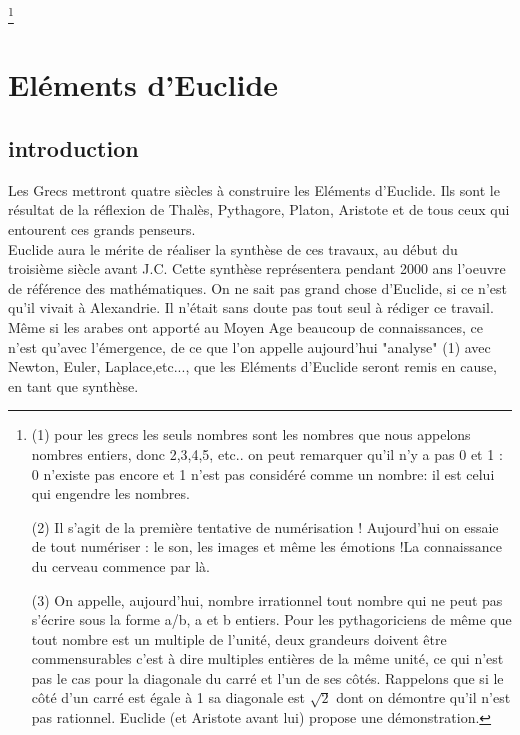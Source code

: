 \documentclass[a4paper, 12pt, twoside]{book}
\begin{document}
      \footnote{(1) pour les grecs les seuls nombres sont les nombres que nous appelons nombres entiers, donc 2,3,4,5, etc.. on peut remarquer qu'il n'y a pas 0 et 1 : 0 n'existe pas encore  et 1 n'est pas considéré comme un nombre: il est celui qui engendre les nombres.
      
      (2) Il s'agit de la première tentative de numérisation !  Aujourd'hui on essaie de tout numériser : le son, les images et même les émotions !La connaissance du cerveau commence  par là. \bigskip
   
    (3) On appelle, aujourd'hui, nombre irrationnel tout nombre qui ne peut pas  s'écrire sous la forme a/b, a et b entiers.
    Pour les pythagoriciens de même que tout nombre est un multiple de l'unité, deux grandeurs doivent être commensurables c'est à dire multiples entières de la même unité, ce qui n'est pas le cas pour la diagonale du carré et l'un de ses côtés.  
     Rappelons que si le côté d'un carré est égale à 1 sa diagonale est $\sqrt{2}$ dont on démontre qu'il n'est pas rationnel. Euclide (et Aristote avant lui)  propose une démonstration.} 
      
    
      
      \newpage 
       \chapter{Eléments d'Euclide}
  \section{introduction}
  
   Les Grecs mettront quatre siècles à construire les Eléments d'Euclide. Ils sont le résultat de la réflexion de Thalès, Pythagore, Platon, Aristote et de tous ceux qui entourent ces grands penseurs.\\
   
    Euclide aura le mérite de réaliser la synthèse de ces travaux, au début du troisième siècle avant J.C. Cette synthèse
   représentera pendant 2000 ans l'oeuvre de référence des mathématiques. On ne sait pas grand chose d'Euclide, si ce n'est qu'il vivait à Alexandrie. Il n'était sans doute pas tout seul à rédiger ce travail.\\
       
       
      Même si les arabes ont apporté au Moyen Age beaucoup de connaissances, ce n'est qu'avec l'émergence, de ce que l'on appelle aujourd'hui "analyse" (1) avec Newton, Euler, Laplace,etc...,  que les Eléments d'Euclide seront remis en cause, en tant que synthèse.\bigskip 
   
\end{document}
